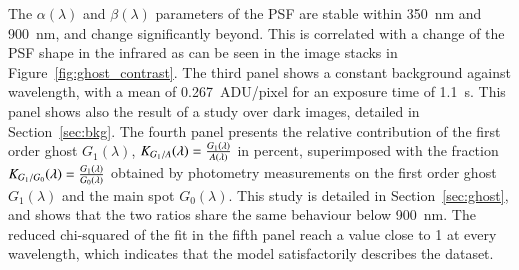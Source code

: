 The $\alpha(\lambda)$ and $\beta(\lambda)$ parameters of the PSF are stable within \SI{350}{\nano\meter} and \SI{900}{\nano\meter}, and change significantly beyond. This is correlated with a change of the PSF shape in the infrared as can be seen in the image stacks in Figure~\ref{fig:ghost_contrast}. The third panel shows a constant background against wavelength, with a mean of \SI{0.267}{ADU/pixel} for an exposure time of \SI{1.1}{\second}. This panel shows also the result of a study over dark images, detailed in Section~\ref{sec:bkg}. The fourth panel presents the relative contribution of the first order ghost $G_1(\lambda)$, $K_{G_1/A}(\lambda) = \frac{G_1(\lambda)}{A(\lambda)}$ in percent, superimposed with the fraction $K_{G_1/G_0}(\lambda)=\frac{G_1(\lambda)}{G_0(\lambda)}$ obtained by photometry measurements on the first order ghost $G_1(\lambda)$ and the main spot $G_0(\lambda)$. This study is detailed in Section~\ref{sec:ghost}, and shows that the two ratios share the same behaviour below \SI{900}{\nano\meter}. The reduced chi-squared of the fit in the fifth panel reach a value close to 1 at every wavelength, which indicates that the model satisfactorily describes the dataset.

